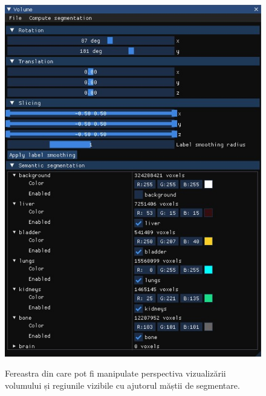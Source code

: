 \begin{figure}[!h]
    \centering
    \includegraphics[width=12cm]{images/wnd_vol.jpg}
    \\
    \caption{Fereastra din care pot fi manipulate perspectiva vizualizării volumului și regiunile vizibile cu ajutorul măștii de segmentare.}
    \label{fig:viz_volume_wnd}
\end{figure}

